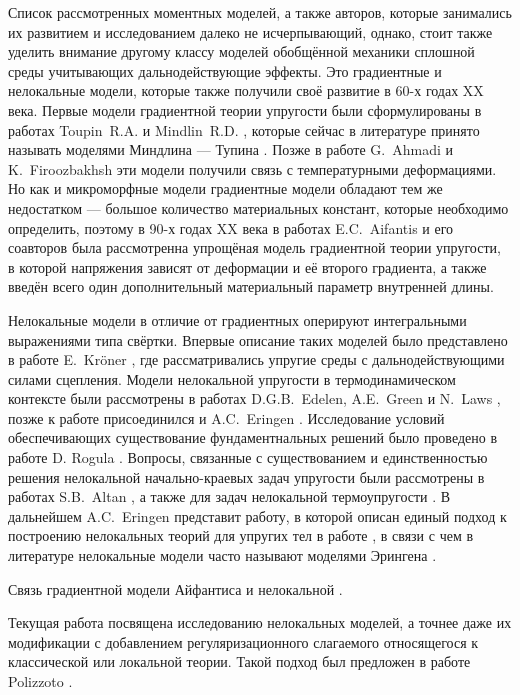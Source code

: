 Список рассмотренных моментных моделей, а также авторов, которые занимались их развитием и исследованием далеко не исчерпывающий, однако, стоит также уделить внимание другому классу моделей обобщённой механики сплошной среды учитывающих дальнодействующие эффекты. Это градиентные и нелокальные модели, которые также получили своё развитие в 60-х годах XX века. Первые модели градиентной теории упругости были сформулированы в работах Toupin~R.A. \cite{Toupin} и Mindlin~R.D. \cite{Mindlin4, Mindlin5}, которые сейчас в литературе принято называть моделями Миндлина --- Тупина \cite{ToupinMindlin1, ToupinMindlin2, ToupinMindlin3}. Позже в работе G.~Ahmadi и K.~Firoozbakhsh \cite{GradientThermoelasticity} эти модели получили связь с температурными деформациями. Но как и микроморфные модели градиентные модели обладают тем же недостатком --- большое количество материальных констант, которые необходимо определить, поэтому в 90-х годах XX века в работах E.C.~Aifantis и его соавторов \cite{Aifantis1, Aifantis2} была рассмотренна упрощёная модель градиентной теории упругости, в которой напряжения зависят от деформации и её второго градиента, а также введён всего один дополнительный материальный параметр внутренней длины.

Нелокальные модели в отличие от градиентных оперируют интегральными выражениями типа свёртки. Впервые описание таких моделей было представлено в работе E.~Kr{\"o}ner \cite{Kroner}, где рассматривались упругие среды с дальнодействующими силами сцепления. Модели нелокальной упругости в термодинамическом контексте были рассмотрены в работах D.G.B.~Edelen, A.E.~Green и N.~Laws \cite{Edelen1, Edelen2}, позже к работе присоединился и A.C.~Eringen \cite{Eringen5, Eringen6}. Исследование условий обеспечивающих существование фундаментнальных решений было проведено в работе D. Rogula \cite{Rogula1982}. Вопросы, связанные с существованием и единственностью решения нелокальной начально-краевых задач упругости были рассмотрены в работах S.B.~Altan \cite{Altan1, Altan2}, а также для задач нелокальной термоупругости \cite{Altan3, Altan4}. В дальнейшем A.C.~Eringen представит работу, в которой описан единый подход к построению нелокальных теорий для упругих тел в работе \cite{Eringen1}, в связи с чем в литературе нелокальные модели часто называют моделями Эрингена \cite{BondaryLayer, Tuna, Rahmani}.

Связь градиентной модели Айфантиса и нелокальной \cite{Aifantis3, Gao}.

Текущая работа посвящена исследованию нелокальных моделей, а точнее даже их модификации с добавлением регуляризационного слагаемого относящегося к классической или локальной теории. Такой подход был предложен в работе Polizzoto \cite{Polizzotto1}.

